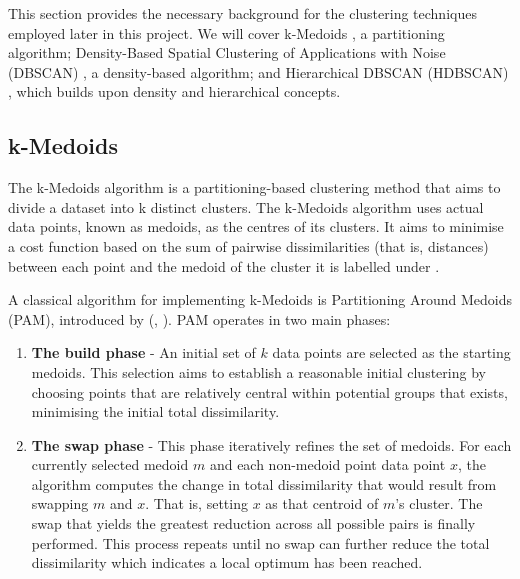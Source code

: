 \documentclass[10pt,oneside]{report}
\renewcommand{\citet}[1]{\citeauthor{#1}, \citeyear{#1}}
\begin{document}
This section provides the necessary background for the clustering techniques employed later in this project. We will cover k-Medoids \cite{kmedoids}, a partitioning algorithm; Density-Based Spatial Clustering of Applications with Noise (DBSCAN) \cite{ester1996density}, a density-based algorithm; and Hierarchical DBSCAN (HDBSCAN) \cite{campello2013density}, which builds upon density and hierarchical concepts.


\subsection{k-Medoids}\label{sec:kmedoids}
The k-Medoids algorithm is a partitioning-based clustering method that aims to divide a dataset into k distinct clusters. The k-Medoids algorithm uses actual data points, known as medoids, as the centres of its clusters. It aims to minimise a cost function based on the sum of pairwise dissimilarities (that is, distances) between each point and the medoid of the cluster it is labelled under \cite{kmedoids}.

A classical algorithm for implementing k-Medoids is Partitioning Around Medoids (PAM), introduced by (\citet{kmedoids}). PAM operates in two main phases:

\begin{enumerate}
    \item \textbf{The build phase} - An initial set of $k$ data points are selected as the starting medoids. This selection aims to establish a reasonable initial clustering by choosing points that are relatively central within potential groups that exists, minimising the initial total dissimilarity.
    \item \textbf{The swap phase} - This phase iteratively refines the set of medoids. For each currently selected medoid $m$ and each non-medoid point data point $x$, the algorithm computes the change in total dissimilarity that would result from swapping $m$ and $x$. That is, setting $x$ as that centroid of $m$'s cluster. The swap that yields the greatest reduction across all possible pairs is finally performed. This process repeats until no swap can further reduce the total dissimilarity which indicates a local optimum has been reached.
\end{enumerate}
\end{document}
